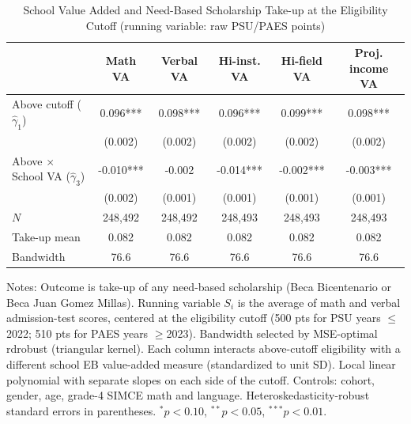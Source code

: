\begin{table}[!htbp]
\centering
\caption{School Value Added and Need-Based Scholarship Take-up at the Eligibility Cutoff (running variable: raw PSU/PAES points)}
\label{tab:any-scholarship-rd-va-interaction-pts}
\begin{tabular}{lccccc}
\toprule
 & Math VA & Verbal VA & Hi-inst. VA & Hi-field VA & Proj. income VA \\
\midrule
Above cutoff ($\hat{\gamma}_1$) & 0.096*** & 0.098*** & 0.096*** & 0.099*** & 0.098*** \\
        & (0.002) & (0.002) & (0.002) & (0.002) & (0.002) \\
Above $\times$ School VA ($\hat{\gamma}_3$) & -0.010*** & -0.002 & -0.014*** & -0.002*** & -0.003*** \\
        & (0.002) & (0.001) & (0.001) & (0.001) & (0.001) \\
\midrule
$N$ & 248,492 & 248,492 & 248,493 & 248,493 & 248,493 \\
Take-up mean & 0.082 & 0.082 & 0.082 & 0.082 & 0.082 \\
Bandwidth & 76.6 & 76.6 & 76.6 & 76.6 & 76.6 \\
\bottomrule
\end{tabular}
\par\medskip\footnotesize
\begin{minipage}{\textwidth}
Notes: Outcome is take-up of any need-based scholarship (Beca Bicentenario or Beca Juan Gomez Millas). Running variable $S_i$ is the average of math and verbal admission-test scores, centered at the eligibility cutoff (500 pts for PSU years $\leq$2022; 510 pts for PAES years $\geq$2023). Bandwidth selected by MSE-optimal rdrobust (triangular kernel). Each column interacts above-cutoff eligibility with a different school EB value-added measure (standardized to unit SD). Local linear polynomial with separate slopes on each side of the cutoff. Controls: cohort, gender, age, grade-4 SIMCE math and language. Heteroskedasticity-robust standard errors in parentheses. $^{*}p<0.10$, $^{**}p<0.05$, $^{***}p<0.01$.
\end{minipage}
\end{table}
